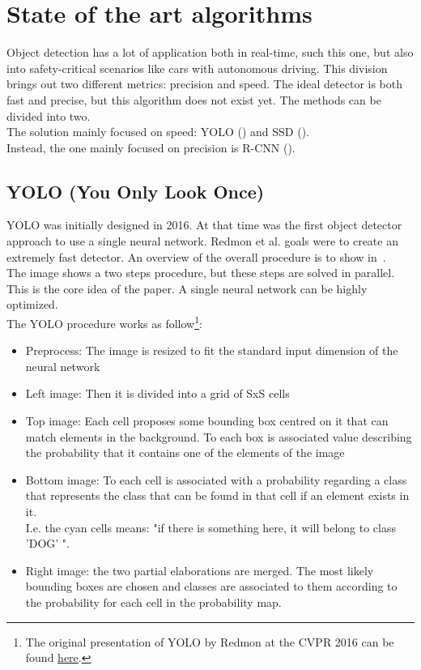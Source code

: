 \section{State of the art algorithms}
Object detection has a lot of application both in real-time, such this one, but also into safety-critical scenarios like cars with autonomous driving. This division brings out two different metrics: precision and speed. The ideal detector is both fast and precise, but this algorithm does not exist yet. The methods can be divided into two.\\
The solution mainly focused on speed: YOLO () and SSD ().\\
Instead, the one mainly focused on precision is R-CNN ().

\subsection{YOLO (You Only Look Once)} \label{sec:yolo}
YOLO\cite{yolo} was initially designed in 2016. At that time was the first object detector approach to use a single neural network. Redmon et al. goals were to create an extremely fast detector. An overview of the overall procedure is to show in~.\\
The image shows a two steps procedure, but these steps are solved in parallel. This is the core idea of the paper. A single neural network can be highly optimized.\\
The YOLO procedure works as follow\footnote{The original presentation of YOLO by Redmon at the CVPR 2016 can be found \href{https://www.youtube.com/watch?v=NM6lrxy0bxs}{here}.}:
\begin{itemize}
	\item Preprocess: The image is resized to fit the standard input dimension of the neural network
	\item Left image: Then it is divided into a grid of SxS cells
	\item Top image: Each cell proposes some bounding box centred on it that can match elements in the background. To each box is associated value describing the probability that it contains one of the elements of the image
	\item Bottom image: To each cell is associated with a probability regarding a class that represents the class that can be found in that cell if an element exists in it.\\
	I.e. the cyan cells means: "if there is something here, it will belong to class 'DOG' ".
	\item Right image: the two partial elaborations are merged. The most likely bounding boxes are chosen and classes are associated to them according to the probability for each cell in the probability map.
\end{itemize}

